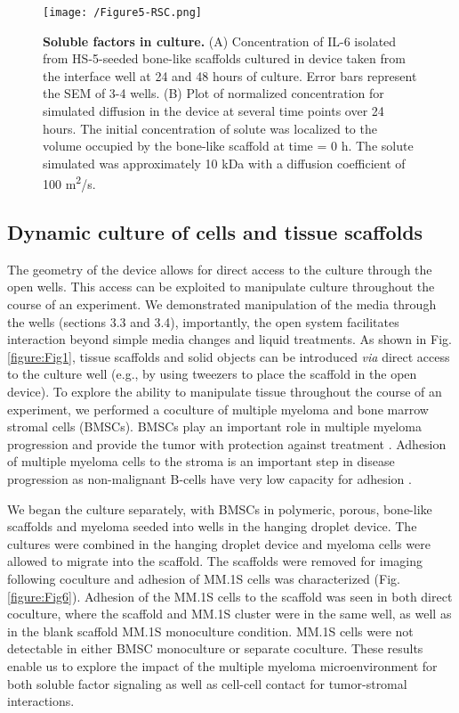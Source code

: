 \begin{figure}[h!] %
\centering
\texttt{[image: /Figure5-RSC.png]}
\caption[\textbf{Soluble factors in culture.}]{\textbf{Soluble factors in culture.} (A) Concentration of IL-6 isolated from HS-5-seeded bone-like scaffolds cultured in device taken from the interface well at 24 and 48 hours of culture. Error bars represent the SEM of 3-4 wells. (B) Plot of normalized concentration for simulated diffusion in the device at several time points over 24 hours. The initial concentration of solute was localized to the volume occupied by the bone-like scaffold at time = 0 h. The solute simulated was approximately 10 kDa with a diffusion coefficient of 100 \textmu m\textsuperscript{2}/s.}
\label{figure:Fig5}
\end{figure}


\subsection{Dynamic culture of cells and tissue scaffolds}
The geometry of the device allows for direct access to the culture through the open wells. This access can be exploited to manipulate culture throughout the course of an experiment. We demonstrated manipulation of the media through the wells (sections 3.3 and 3.4), importantly, the open system facilitates interaction beyond simple media changes and liquid treatments. As shown in Fig. \ref{figure:Fig1}, tissue scaffolds and solid objects can be introduced \textit{via} direct access to the culture well (e.g., by using tweezers to place the scaffold in the open device). To explore the ability to manipulate tissue throughout the course of an experiment, we performed a coculture of multiple myeloma and bone marrow stromal cells (BMSCs). BMSCs play an important role in multiple myeloma progression and provide the tumor with protection against treatment \cite{Chauhan1996, Chatterjee2002a}. Adhesion of multiple myeloma cells to the stroma is an important step in disease progression as non-malignant B-cells have very low capacity for adhesion \cite{Tai2006}.

We began the culture separately, with BMSCs in polymeric, porous, bone-like scaffolds and myeloma seeded into wells in the hanging droplet device. The cultures were combined in the hanging droplet device and myeloma cells were allowed to migrate into the scaffold. The scaffolds were removed for imaging following coculture and adhesion of MM.1S cells was characterized (Fig. \ref{figure:Fig6}). Adhesion of the MM.1S cells to the scaffold was seen in both direct coculture, where the scaffold and MM.1S cluster were in the same well, as well as in the blank scaffold MM.1S monoculture condition. MM.1S cells were not detectable in either BMSC monoculture or separate coculture. These results enable us to explore the impact of the multiple myeloma microenvironment for both soluble factor signaling as well as cell-cell contact for tumor-stromal interactions. 

